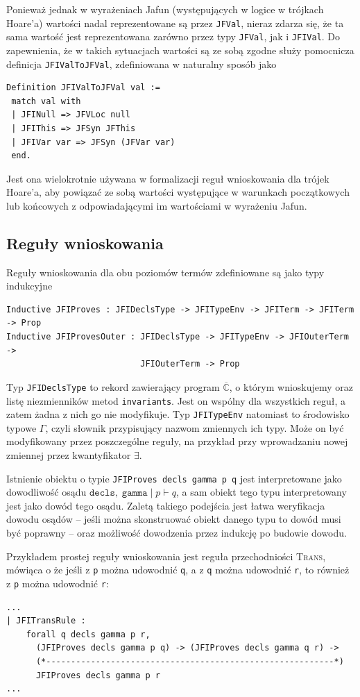 \documentclass[]{pracamgr}
\renewcommand \| {\hspace{0.75em} | \hspace{0.75em} }
\renewcommand \[ {[\![}
\renewcommand \] {]\!]}
\theoremstyle{definition}
\begin{document}
Ponieważ jednak w wyrażeniach Jafun (występujących w logice w trójkach Hoare'a)
wartości nadal reprezentowane są przez \texttt{JFVal}, nieraz zdarza się, że ta sama wartość
jest reprezentowana zarówno przez typy \texttt{JFVal}, jak i \texttt{JFIVal}.
Do zapewnienia, że w takich sytuacjach wartości są ze sobą zgodne służy pomocnicza
definicja \texttt{JFIValToJFVal}, zdefiniowana w naturalny sposób jako
\begin{verbatim}
Definition JFIValToJFVal val :=
 match val with
 | JFINull => JFVLoc null
 | JFIThis => JFSyn JFThis
 | JFIVar var => JFSyn (JFVar var)
 end.
\end{verbatim}
Jest ona wielokrotnie używana w formalizacji reguł wnioskowania dla trójek Hoare'a,
aby powiązać ze sobą wartości występujące w warunkach początkowych lub końcowych
z odpowiadającymi im wartościami w wyrażeniu Jafun.

\subsection{Reguły wnioskowania}
Reguły wnioskowania dla obu poziomów termów zdefiniowane są jako typy indukcyjne
\begin{verbatim}
Inductive JFIProves : JFIDeclsType -> JFITypeEnv -> JFITerm -> JFITerm -> Prop
Inductive JFIProvesOuter : JFIDeclsType -> JFITypeEnv -> JFIOuterTerm ->
                           JFIOuterTerm -> Prop
\end{verbatim}
Typ \texttt{JFIDeclsType} to rekord zawierający program $\overline{\mathbb{C}}$,
o którym wnioskujemy oraz listę niezmienników metod \texttt{invariants}.
Jest on wspólny dla wszystkich reguł, a zatem żadna z nich go nie modyfikuje.
Typ \texttt{JFITypeEnv} natomiast to środowisko typowe $\Gamma$,
czyli słownik przypisujący nazwom zmiennych ich typy. Może on być modyfikowany przez
poszczególne reguły, na przykład przy wprowadzaniu nowej zmiennej przez
kwantyfikator $\exists$.

Istnienie obiektu o typie \texttt{JFIProves decls gamma p q} jest interpretowane jako
dowodliwość osądu $\mathtt{decls,\; gamma}\; |\; p \vdash q$, a sam obiekt tego typu
interpretowany jest jako dowód tego osądu.
Zaletą takiego podejścia jest łatwa weryfikacja dowodu osądów -- jeśli można
skonstruować obiekt danego typu to dowód musi być poprawny -- oraz możliwość
dowodzenia przez indukcję po budowie dowodu.

Przykładem prostej reguły wnioskowania jest reguła przechodniości \textsc{Trans}, mówiąca
o że jeśli z \texttt{p} można udowodnić \texttt{q}, a z \texttt{q} można udowodnić
\texttt{r}, to również z \texttt{p} można udowodnić \texttt{r}:
\begin{verbatim}
...
| JFITransRule :
    forall q decls gamma p r,
      (JFIProves decls gamma p q) -> (JFIProves decls gamma q r) ->
      (*----------------------------------------------------------*)
      JFIProves decls gamma p r
...
\end{verbatim}
\end{document}

